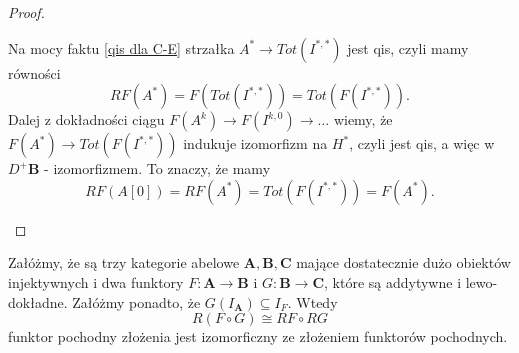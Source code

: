 \begin{proof}
\begin{enumerate}
\begin{center}
    \end{center}
    Na mocy faktu \ref{qis dla C-E} strzałka $A^*\to Tot(I^{*, *})$ jest qis, czyli mamy równości
    $$RF(A^*)=F(Tot(I^{*,*}))=Tot(F(I^{*,*})).$$
    Dalej z dokładności ciągu $F(A^k)\to F(I^{k,0})\to...$ wiemy, że $F(A^*)\to Tot(F(I^{*,*}))$ indukuje izomorfizm na $H^*$, czyli jest qis, a więc w $D^+\mathbf{B}$ - izomorfizmem. To znaczy, że mamy
    $$RF(A[0])=RF(A^*)=Tot(F(I^{*,*}))=F(A^*).$$

  \end{enumerate}
\end{proof}

\begin{theorem}
  Załóżmy, że są trzy kategorie abelowe $\mathbf{A},\mathbf{B},\mathbf{C}$ mające dostatecznie dużo obiektów injektywnych i dwa funktory $F:\mathbf{A}\to \mathbf{B}$ i $G:\mathbf{B}\to \mathbf{C}$, które są addytywne i lewo-dokładne. Załóżmy ponadto, że $G(I_\mathbf{A})\subseteq I_F$. Wtedy
  $$R(F\circ G)\cong RF\circ RG$$
  funktor pochodny złożenia jest izomorficzny ze złożeniem funktorów pochodnych.
\end{theorem}

